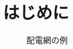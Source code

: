 
\section{はじめに}

\begin{figure}[tb]
\centering

\caption{配電網の例}
\label{fig:test-input}
\end{figure}

